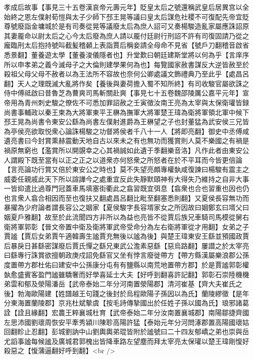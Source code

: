 孝成后故事【事見三十五卷漢哀帝元壽元年】貶皇太后之號還稱武皇后居異宫以全始終之恩左僕射荀愷與太子少師下邳王晃等議曰皇太后謀危社稷不可復配先帝宜貶尊號廢詣金墉城於是有司奏從晃等議廢太后為庶人詔可又奏楊駿造亂家屬應誅詔原其妻龎命以尉太后之心今太后廢為庶人請以龎付廷尉行刑詔不許有司復固請乃從之龐臨刑太后抱持號叫截髪稽顙上表詣賈后稱妾請全母命不見省【號戶刀翻稽音啟省悉景翻】董養遊太學【董養浚儀隱者也】升堂歎曰朝廷建斯堂將以何為乎【言庠序所以申孝弟之義今滅母子之大倫則建學果何為也】每覽國家赦書謀反大逆皆赦至於殺祖父母父母不赦者以為王法所不容故也奈何公卿處議文飾禮典乃至此乎【處昌呂翻】天人之理既滅大亂將作矣【養後與妻荷擔入蜀不知所終】有司收駿官屬欲誅之侍中傅祗啟曰昔魯芝為曹爽司馬斬關赴爽【事見七十五卷魏邵陵厲公嘉平元年】宣帝用為青州刺史駿之僚佐不可悉加罪詔赦之壬寅徵汝南王亮為太宰與太保衛瓘皆録尚書事輔政以秦王柬為大將軍東平王楙為撫軍大將軍楚王瑋為衛將軍領北軍中候下邳王晃為尚書令東安公繇為尚書左僕射進爵為王楙望之子也封董猛為武安侯三兄皆為亭侯亮欲取悦衆心論誅楊駿之功督將侯者千八十一人【將即亮翻】御史中丞傅咸遺亮書曰今封賞熏赫震動天地自古以來未之有也無功而獲賞則人莫不樂國之有禍是禍原無窮也【濫賞所以開覬幸之心其禍誠如此遺于季翻樂音洛】凡作此者由東安公人謂殿下既至當有以正之正之以道衆亦何怒衆之所怒者在於不平耳而今皆更倍論【言亮論功行賞又倍於東安公之時也】莫不失望亮頗專權埶咸復諫曰楊駿有震主之威委任親戚此天下所以諠譁今之處重宜反此失靜默頤神有大得失乃維持之自非大事一皆抑遣比過尊門冠蓋車馬填塞街衢此之翕習既宜弭息【翕衆也合也習重也因也仍也言衆人翕合相因而至也復扶又翻處昌呂翻比毗至翻塞悉則翻】又夏侯長容無功而暴擢為少府論者謂長容公之姻家【夏侯駿字長容壻家女之所因故曰姻鄭玄曰壻父曰姻夏戶雅翻】故至於此流聞四方非所以為益也亮皆不從賈后族兄車騎司馬模從舅右衛將軍郭彰【晉文帝置中衛及衛將軍武帝受命分為左右衛將軍從才用翻】女弟之子賈謐【賈后女弟賈午適韓壽生謐賈充無後以謐為後】與楚王瑋東安王繇並預國政賈后暴戾日甚繇密謀廢后賈氏憚之繇兄東武公澹素惡繇【惡烏路翻】屢譛之於太宰亮曰繇專行誅賞欲擅朝政庚戍詔免繇官又坐有悖言廢徙帶方【帶方縣漢屬樂浪郡公孫度置帶方郡杜佑曰建安中公孫康分屯有有鹽縣以南荒地置帶方郡】於是賈謐郭彰權埶愈盛賓客盈門謐雖驕奢而好學喜延士大夫【好呼到翻喜許記翻】郭彰石崇陸機機弟雲和郁及滎陽潘岳【武帝泰始二年分河南置滎陽郡】清河崔基【齊大夫崔氏之後】勃海歐陽建【姓譜越王句踐之後封於烏程歐陽子孫因以為氏】蘭陵繆徵【是年分東海置蘭陵郡】京兆杜斌摰虞【按毛詩傳摯國出於任姓子孫以國為氏】琅邪諸葛詮【詮且緣翻】宏農王粹襄城杜育【武帝泰始二年分汝南置襄城郡】南陽鄒捷齊國左思沛國劉瓌周恢安平牽秀潁川陳聄高陽許猛【泰始元年分河問涿郡置高陽國瓌姑回翻眕止忍翻】彭城劉訥中山劉輿輿弟琨皆附於謐號曰二十四友郁嶠之弟也崇與岳尤謟事謐每候謐及廣城君郭槐出皆降車路左望塵而拜太宰亮太保瓘以楚王瑋剛愎好殺惡之【愎蒲逼翻好呼到翻】<br />
